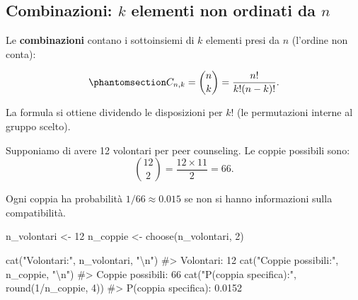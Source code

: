 \documentclass[
  letterpaper,
  DIV=11,
  numbers=noendperiod,
  oneside]{scrreprt}
\newenvironment{Shaded}{\begin{snugshade}}{\end{snugshade}}
\newcommand{\CommentTok}[1]{\textcolor[rgb]{0.37,0.37,0.37}{#1}}
\newcommand{\DecValTok}[1]{\textcolor[rgb]{0.68,0.00,0.00}{#1}}
\newcommand{\FunctionTok}[1]{\textcolor[rgb]{0.28,0.35,0.67}{#1}}
\newcommand{\NormalTok}[1]{\textcolor[rgb]{0.00,0.23,0.31}{#1}}
\newcommand{\OtherTok}[1]{\textcolor[rgb]{0.00,0.23,0.31}{#1}}
\newcommand{\SpecialCharTok}[1]{\textcolor[rgb]{0.37,0.37,0.37}{#1}}
\newcommand{\StringTok}[1]{\textcolor[rgb]{0.13,0.47,0.30}{#1}}
\theoremstyle{definition}
\theoremstyle{plain}
\theoremstyle{definition}
\theoremstyle{remark}
\begin{document}
\subsection{\texorpdfstring{Combinazioni: \(k\) elementi non ordinati da
\(n\)}{Combinazioni: k elementi non ordinati da n}}\label{combinazioni-k-elementi-non-ordinati-da-n}

Le \textbf{combinazioni} contano i sottoinsiemi di \(k\) elementi presi
da \(n\) (l'ordine non conta):

\begin{equation}\phantomsection\label{eq-combinations-def}{
C_{n,k} = \binom{n}{k} = \frac{n!}{k!(n-k)!}.
}\end{equation}

La formula si ottiene dividendo le disposizioni per \(k!\) (le
permutazioni interne al gruppo scelto).

\begin{tcolorbox}[enhanced jigsaw, arc=.35mm, breakable, colbacktitle=quarto-callout-note-color!10!white, opacityback=0, toprule=.15mm, rightrule=.15mm, colback=white, opacitybacktitle=0.6, leftrule=.75mm, coltitle=black, bottomtitle=1mm, left=2mm, toptitle=1mm, title=\textcolor{quarto-callout-note-color}{\faInfo}\hspace{0.5em}{Esempio: formazione di coppie terapeutiche}, titlerule=0mm, bottomrule=.15mm, colframe=quarto-callout-note-color-frame]

Supponiamo di avere 12 volontari per peer counseling. Le coppie
possibili sono: \[
\binom{12}{2} = \frac{12 \times 11}{2} = 66.
\]

Ogni coppia ha probabilità \(1/66 \approx 0.015\) se non si hanno
informazioni sulla compatibilità.

\end{tcolorbox}

\begin{Shaded}
\begin{Highlighting}[]
\NormalTok{n\_volontari }\OtherTok{\textless{}{-}} \DecValTok{12}
\NormalTok{n\_coppie }\OtherTok{\textless{}{-}} \FunctionTok{choose}\NormalTok{(n\_volontari, }\DecValTok{2}\NormalTok{)}

\FunctionTok{cat}\NormalTok{(}\StringTok{"Volontari:"}\NormalTok{, n\_volontari, }\StringTok{"}\SpecialCharTok{\textbackslash{}n}\StringTok{"}\NormalTok{)}
\CommentTok{\#\textgreater{} Volontari: 12}
\FunctionTok{cat}\NormalTok{(}\StringTok{"Coppie possibili:"}\NormalTok{, n\_coppie, }\StringTok{"}\SpecialCharTok{\textbackslash{}n}\StringTok{"}\NormalTok{)}
\CommentTok{\#\textgreater{} Coppie possibili: 66}
\FunctionTok{cat}\NormalTok{(}\StringTok{"P(coppia specifica):"}\NormalTok{, }\FunctionTok{round}\NormalTok{(}\DecValTok{1}\SpecialCharTok{/}\NormalTok{n\_coppie, }\DecValTok{4}\NormalTok{))}
\CommentTok{\#\textgreater{} P(coppia specifica): 0.0152}
\end{Highlighting}
\end{Shaded}
\end{document}
